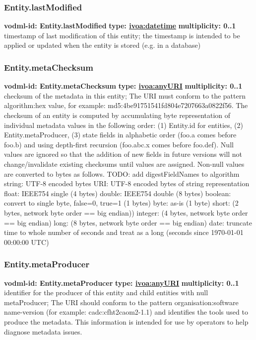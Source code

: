     \subsubsection{Entity.lastModified}
      \textbf{vodml-id: Entity.lastModified} \newline
      \textbf{type: \hyperref[sect:ivoa]{ivoa:datetime}} \newline
      \textbf{multiplicity: 0..1} \newline
      timestamp of last modification of this entity; the timestamp is intended to be applied or updated when the entity is stored (e.g. in a database)

    \subsubsection{Entity.metaChecksum}
      \textbf{vodml-id: Entity.metaChecksum} \newline
      \textbf{type: \hyperref[sect:ivoa]{ivoa:anyURI}} \newline
      \textbf{multiplicity: 0..1} \newline
      checksum of the metadata in this entity; The URI must conform to the pattern {algorithm}:{hex value}, for example: md5:4be91751541fd804e7207663a0822f56. The checksum of an entity is computed by accumulating byte representation of individual metadata values in the following order: (1) Entity.id for entities, (2) Entity.metaProducer, (3) state fields in alphabetic order (foo.a comes before foo.b) and using depth-first recursion (foo.abc.x comes before foo.def). Null values are ignored so that the addition of new fields in future versions will not change/invalidate existing checksums until values are assigned. Non-null values are converted to bytes as follows. TODO: add digestFieldNames to algorithm string: UTF-8 encoded bytes URI: UTF-8 encoded bytes of string representation float: IEEE754 single (4 bytes) double: IEEE754 double (8 bytes) boolean: convert to single byte, false=0, true=1 (1 bytes) byte: as-is (1 byte) short: (2 bytes, network byte order == big endian)) integer: (4 bytes, network byte order == big endian) long: (8 bytes, network byte order == big endian) date: truncate time to whole number of seconds and treat as a long (seconds since 1970-01-01 00:00:00 UTC)

    \subsubsection{Entity.metaProducer}
      \textbf{vodml-id: Entity.metaProducer} \newline
      \textbf{type: \hyperref[sect:ivoa]{ivoa:anyURI}} \newline
      \textbf{multiplicity: 0..1} \newline
      identifier for the producer of this entity and child entities with null metaProducer; The URI should conform to the pattern {organisation}:{software name-version} (for example: cadc:cfht2caom2-1.1) and identifies the tools used to produce the metadata. This information is intended for use by operators to help diagnose metadata issues.

